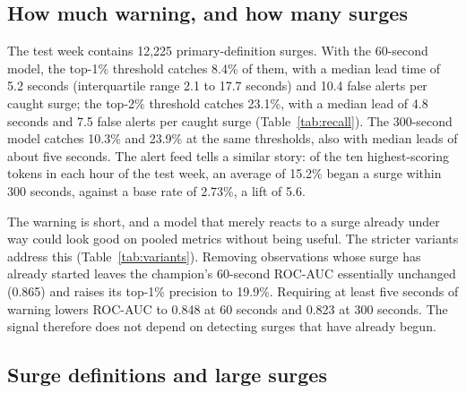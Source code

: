\subsection{How much warning, and how many surges}

The test week contains 12,225 primary-definition surges. With the 60-second model, the top-1\% threshold catches 8.4\% of them, with a median lead time of 5.2 seconds (interquartile range 2.1 to 17.7 seconds) and 10.4 false alerts per caught surge; the top-2\% threshold catches 23.1\%, with a median lead of 4.8 seconds and 7.5 false alerts per caught surge (Table~\ref{tab:recall}). The 300-second model catches 10.3\% and 23.9\% at the same thresholds, also with median leads of about five seconds. The alert feed tells a similar story: of the ten highest-scoring tokens in each hour of the test week, an average of 15.2\% began a surge within 300 seconds, against a base rate of 2.73\%, a lift of 5.6.

\begin{table}[t]
\centering
\caption{Event-level recall on the test week (12,225 primary surges). Lead time is measured from the earliest alerted observation to onset. False alerts are top-ranked observations whose token has no onset in the following 300 seconds.}
\label{tab:recall}
\tabsize
\setlength{\tabcolsep}{4pt}

\end{table}

The warning is short, and a model that merely reacts to a surge already under way could look good on pooled metrics without being useful. The stricter variants address this (Table~\ref{tab:variants}). Removing observations whose surge has already started leaves the champion's 60-second ROC-AUC essentially unchanged (0.865) and raises its top-1\% precision to 19.9\%. Requiring at least five seconds of warning lowers ROC-AUC to 0.848 at 60 seconds and 0.823 at 300 seconds. The signal therefore does not depend on detecting surges that have already begun.

\begin{table}[t]
\centering
\caption{Champion results on the test week under the stricter evaluation variants.}
\label{tab:variants}
\tabsize

\end{table}

\subsection{Surge definitions and large surges}

